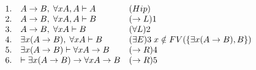 \documentclass[11pt,letterpaper]{article}
\begin{document}
\[
\ba{rll}
1. &  A\imp B,\;\fa x A,  A\vdash  A & (Hip)\\
2. &  A\imp B,\;\fa x A,  A\vdash  B & (\to L) 1\\
3. &  A\imp B,\;\fa x A \vdash  B & (\fa L) 2\\
4. & \ex x( A\imp B),\;\fa x A\vdash   B 
 & (\ex E) 3 \;x\notin FV(\{\ex x( A\imp B), B\})\\
5. & \ex x( A\imp B)\vdash \fa x A \to  B  & (\to R) 4\\
6. & \vdash \ex x( A\imp B) \to \fa x A \to   B  & (\to R) 5 \\
\ea
\]

\begin{comment}
\item $\vdash_c (\fa x A\imp B)\imp \ex x( A\imp B)$ con $x\notin
  FV( B)$.  Puesto que estamos en lógica clásica basta probar
$\fa x A\imp B\vdash_c \neg\fa x\neg( A\imp B)$, es decir, 
$\fa x A\imp B,\;\fa x\neg( A\imp B)\vdash_c \bot$.

\[
\ba{rll}
1. & \fa x A\imp B,\;\fa x\neg( A\imp B)\vdash \fa
x\neg( A\imp B)  & (Hip)\\
2. & \fa x A\imp B,\;\fa x\neg( A\imp B)\vdash \neg( A\imp B)
& (\fa E,1)\\
3. & \fa x A\imp B,\;\fa x\neg( A\imp B)\vdash  A\land\neg  B & 
(equiv.\;
logica, 2) \\
4. & \fa x A\imp B,\;\fa x\neg( A\imp B)\vdash  A  & (\land E,3)
\\
5. & \fa x A\imp B,\;\fa x\neg( A\imp B)\vdash \fa x A  & (\fa
I,4),\;x\notin FV(\{\fa x A\imp B,\;\fa x\neg( A\imp B)\}) \\
6. & \fa x A\imp B,\;\fa x\neg( A\imp B)\vdash \fa x A\imp B
& (Hip)\\
7. & \fa x A\imp B,\;\fa x\neg( A\imp B)\vdash  B  & (\imp
E,5,6)\\
8. & \fa x A\imp B,\;\fa x\neg( A\imp B)\vdash\neg  B & (\land E,
3) \\
9. & \fa x A\imp B,\;\fa x\neg( A\imp B)\vdash\bot & (\imp E, 7,8) \\
\ea
\]

\item $\vdash_m\fa xA\imp\neg\ex x\neg A$. 
Basta ver que $\fa xA,\;\ex x\neg A\vdash_m\bot$
\[
\ba{rll}
1. & \fa x A,\ex x\neg A\vdash \ex x\neg A & (Hip).\\
2. & \fa x A,\ex x\neg A,\neg A\vdash \neg A & (Hip).\\
3. & \fa x A,\ex x\neg A,\neg A\vdash \fa x A & (Hip).\\
4. & \fa x A,\ex x\neg A,\neg A\vdash A & (\fa E,3).\\
5. & \fa x A,\ex x\neg A,\neg A\vdash \bot & (\imp E,2,4).\\
6. & \fa x A,\ex x\neg A\vdash \bot & (\ex E,1,5),\;x\notin FV(\{\fa x A,\ex 
x\neg A,\bot\}).\\
\ea
\]
\end{comment}
\end{document}
